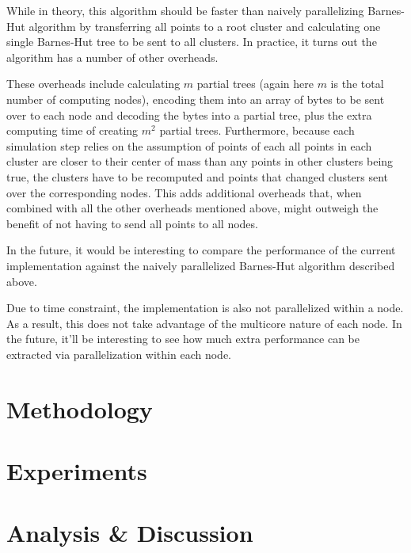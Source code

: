 \documentclass{article}
\begin{document}
While in theory, this algorithm should be faster than naively parallelizing Barnes-Hut algorithm by
transferring all points to a root cluster and calculating one single Barnes-Hut tree to be sent to
all clusters. In practice, it turns out the algorithm has a number of other overheads.

These overheads include calculating \(m\) partial trees (again here \(m\) is the total number of
computing nodes), encoding them into an array of bytes to be sent over to each node and decoding the
bytes into a partial tree, plus the extra computing time of creating \(m^2\) partial trees.
Furthermore, because each simulation step relies on the assumption of points of each all points in
each cluster are closer to their center of mass than any points in other clusters being true, the
clusters have to be recomputed and points that changed clusters sent over the corresponding nodes.
This adds additional overheads that, when combined with all the other overheads mentioned above,
might outweigh the benefit of not having to send all points to all nodes.

In the future, it would be interesting to compare the performance of the current implementation
against the naively parallelized Barnes-Hut algorithm described above.

Due to time constraint, the implementation is also not parallelized within a node. As a result, this
does not take advantage of the multicore nature of each node. In the future, it'll be interesting to
see how much extra performance can be extracted via parallelization within each node.

\section*{Methodology}

\section*{Experiments}

\section*{Analysis \& Discussion}
\end{document}
